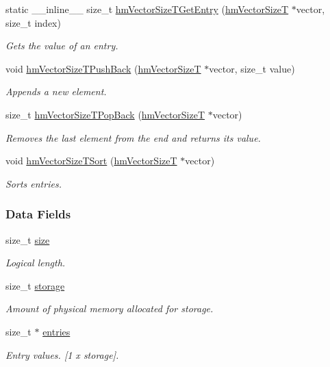 \begin{DoxyCompactItemize}
static \-\_\-\-\_\-inline\-\_\-\-\_\- size\-\_\-t \hyperlink{structhm_vector_size_t_a9555fbbf74015441b9051deb26fffdb9}{hm\-Vector\-Size\-T\-Get\-Entry} (\hyperlink{structhm_vector_size_t}{hm\-Vector\-Size\-T} $\ast$vector, size\-\_\-t index)
\begin{DoxyCompactList}\small\item\em Gets the value of an entry. \end{DoxyCompactList}\item 
void \hyperlink{structhm_vector_size_t_a0c83492eb7aa195dc618be11d29fd884}{hm\-Vector\-Size\-T\-Push\-Back} (\hyperlink{structhm_vector_size_t}{hm\-Vector\-Size\-T} $\ast$vector, size\-\_\-t value)
\begin{DoxyCompactList}\small\item\em Appends a new element. \end{DoxyCompactList}\item 
size\-\_\-t \hyperlink{structhm_vector_size_t_aca0ad1a1a70c6694cdf6713b29167da2}{hm\-Vector\-Size\-T\-Pop\-Back} (\hyperlink{structhm_vector_size_t}{hm\-Vector\-Size\-T} $\ast$vector)
\begin{DoxyCompactList}\small\item\em Removes the last element from the end and returns its value. \end{DoxyCompactList}\item 
void \hyperlink{structhm_vector_size_t_a665e43d5091fbf81d7ce818ef7c5ebe6}{hm\-Vector\-Size\-T\-Sort} (\hyperlink{structhm_vector_size_t}{hm\-Vector\-Size\-T} $\ast$vector)
\begin{DoxyCompactList}\small\item\em Sorts entries. \end{DoxyCompactList}\end{DoxyCompactItemize}
\subsubsection*{Data Fields}
\begin{DoxyCompactItemize}
\item 
size\-\_\-t \hyperlink{structhm_vector_size_t_a854352f53b148adc24983a58a1866d66}{size}
\begin{DoxyCompactList}\small\item\em Logical length. \end{DoxyCompactList}\item 
size\-\_\-t \hyperlink{structhm_vector_size_t_ad69ae78713b41381c4d71371aae6e63e}{storage}
\begin{DoxyCompactList}\small\item\em Amount of physical memory allocated for storage. \end{DoxyCompactList}\item 
size\-\_\-t $\ast$ \hyperlink{structhm_vector_size_t_a80584cc4032a43c83261c16ace4513fc}{entries}
\begin{DoxyCompactList}\small\item\em Entry values. \mbox{[}1 x storage\mbox{]}. \end{DoxyCompactList}\end{DoxyCompactItemize}


